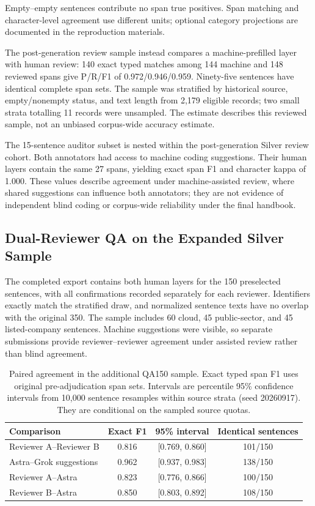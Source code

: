 Empty--empty sentences contribute no span true positives. Span matching and character-level agreement use different units; optional category projections are documented in the reproduction materials.

The post-generation review sample instead compares a machine-prefilled layer with human review: 140 exact typed matches among 144 machine and 148 reviewed spans give P/R/F1 of 0.972/0.946/0.959. Ninety-five sentences have identical complete span sets. The sample was stratified by historical source, empty/nonempty status, and text length from 2,179 eligible records; two small strata totalling 11 records were unsampled. The estimate describes this reviewed sample, not an unbiased corpus-wide accuracy estimate.

The 15-sentence auditor subset is nested within the post-generation Silver review cohort. Both annotators had access to machine coding suggestions. Their human layers contain the same 27 spans, yielding exact span F1 and character kappa of 1.000. These values describe agreement under machine-assisted review, where shared suggestions can influence both annotators; they are not evidence of independent blind coding or corpus-wide reliability under the final handbook.



\FloatBarrier

\subsection{Dual-Reviewer QA on the Expanded Silver Sample}
The completed export contains both human layers for the 150 preselected sentences, with all confirmations recorded separately for each reviewer. Identifiers exactly match the stratified draw, and normalized sentence texts have no overlap with the original 350. The sample includes 60 cloud, 45 public-sector, and 45 listed-company sentences. Machine suggestions were visible, so separate submissions provide reviewer--reviewer agreement under assisted review rather than blind agreement.

\begin{table}[htbp]
\caption{Paired agreement in the additional QA150 sample. Exact typed span F1 uses original pre-adjudication span sets. Intervals are percentile 95\% confidence intervals from 10,000 sentence resamples within source strata (seed 20260917). They are conditional on the sampled source quotas.}
\label{tab:qa150-pairs}
\centering\small
\begin{tabularx}{\linewidth}{@{}Lccc@{}}
\toprule
Comparison & Exact F1 & 95\% interval & Identical sentences \\
\midrule
Reviewer A--Reviewer B & 0.816 & [0.769, 0.860] & 101/150 \\
Astra--Grok suggestions & 0.962 & [0.937, 0.983] & 138/150 \\
Reviewer A--Astra & 0.823 & [0.776, 0.866] & 100/150 \\
Reviewer B--Astra & 0.850 & [0.803, 0.892] & 108/150 \\
\bottomrule
\end{tabularx}
\end{table}

